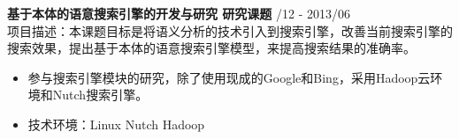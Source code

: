 \documentclass[a4paper]{article}
\newenvironment{changemargin}[2]{%
  \begin{list}{}{%
    \setlength{\topsep}{0pt}%
    \setlength{\leftmargin}{#1}%
    \setlength{\rightmargin}{#2}%
    \setlength{\listparindent}{\parindent}%
    \setlength{\itemindent}{\parindent}%
    \setlength{\parsep}{\parskip}%
  }%
  \item[]}{\end{list}
}
\newenvironment{body} {
	\vspace*{-16pt}
	\begin{changemargin}{-0.25in}{-0.5in}
  }	
	{\end{changemargin}
}
\begin{document}
\begin{body}
	\vspace{14pt}
	
	
	{\textbf{基于本体的语意搜索引擎的开发与研究 研究课题}}{} \hfill {/12 - 2013/06}\\
	项目描述：本课题目标是将语义分析的技术引入到搜索引擎，改善当前搜索引擎的搜索效果，提出基于本体的语意搜索引擎模型，来提高搜索结果的准确率。\\
	\vspace*{-6pt}
	\begin{itemize} \itemsep -0pt  %
		\item 参与搜索引擎模块的研究，除了使用现成的{\fontarial Google}和{\fontarial Bing}，采用{\fontarial Hadoop}云环境和{\fontarial Nutch}搜索引擎。\\
	\end{itemize}
	\vspace*{-12pt}
	\begin{itemize} \itemsep -0pt  %
		\item 技术环境：{\fontarial Linux Nutch Hadoop}\\
	\end{itemize}
	
	

\end{body}
\end{document}
